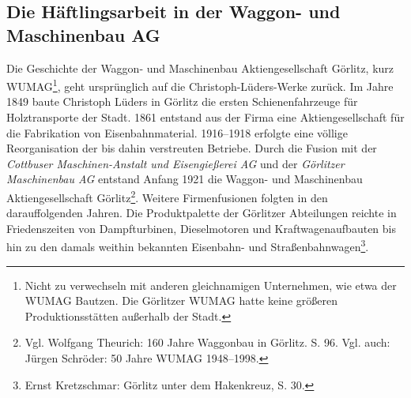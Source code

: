 \subsection{Die Häftlingsarbeit in der Waggon- und Maschinenbau AG}

Die Geschichte der Waggon- und Maschinenbau Aktiengesellschaft Görlitz, kurz WUMAG\footnote{Nicht zu verwechseln mit anderen gleichnamigen Unternehmen, wie etwa der WUMAG Bautzen. Die Görlitzer WUMAG hatte keine größeren Produktionsstätten außerhalb der Stadt.}, geht ursprünglich auf die Christoph-Lüders-Werke zurück. Im Jahre 1849 baute Christoph Lüders in Görlitz die ersten Schienenfahrzeuge für Holztransporte der Stadt. 1861 entstand aus der Firma eine Aktiengesellschaft für die Fabrikation von Eisenbahnmaterial. 1916--1918 erfolgte eine völlige Reorganisation der bis dahin verstreuten Betriebe. Durch die Fusion mit der \emph{Cottbuser Maschinen-Anstalt und Eisengießerei AG} und der \emph{Görlitzer Maschinenbau AG} entstand Anfang 1921 die Waggon- und Maschinenbau Aktiengesellschaft Görlitz\footnote{Vgl. Wolfgang Theurich: 160 Jahre Waggonbau in Görlitz. S. 96. Vgl. auch: Jürgen Schröder: 50 Jahre WUMAG 1948--1998.}. Weitere Firmenfusionen folgten in den darauffolgenden Jahren.
 Die Produktpalette der Görlitzer Abteilungen reichte in Friedenszeiten von Dampfturbinen, Dieselmotoren und Kraftwagenaufbauten bis hin zu den damals weithin bekannten Eisenbahn- und Straßenbahnwagen\footnote{Ernst Kretzschmar: Görlitz unter dem Hakenkreuz, S. 30.}. \newline


